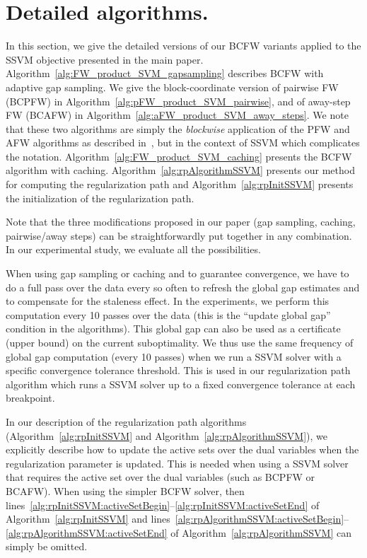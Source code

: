 \documentclass{article}
\begin{document}
\section{Detailed algorithms. \label{app:algorithms}}
In this section, we give the detailed versions of our BCFW variants applied to the SSVM objective presented in the main paper. Algorithm~\ref{alg:FW_product_SVM_gapsampling} describes BCFW with adaptive gap sampling. We give the block-coordinate version of pairwise FW (BCPFW) in Algorithm~\ref{alg:pFW_product_SVM_pairwise}, and of away-step FW (BCAFW) in Algorithm~\ref{alg:aFW_product_SVM_away_steps}. We note that these two algorithms are simply the \emph{blockwise} application of the PFW and AFW algorithms as described in~\citet{LacosteJulien2015linearFW}, but in the context of SSVM which complicates the notation.  Algorithm~\ref{alg:FW_product_SVM_caching} presents the BCFW algorithm with caching. Algorithm~\ref{alg:rpAlgorithmSSVM} presents our method for computing the regularization path and Algorithm~\ref{alg:rpInitSSVM} presents the initialization of the regularization path.

Note that the three modifications proposed in our paper (gap sampling, caching, pairwise/away steps) can be straightforwardly put together in any combination. In our experimental study, we evaluate all the possibilities.

When using gap sampling or caching and to guarantee convergence, we have to do a full pass over the data every so often to refresh the global gap estimates and to compensate for the staleness effect.
In the experiments, we perform this computation every 10 passes over the data (this is the ``update global gap'' condition in the algorithms). This global gap can also be used as a certificate (upper bound) on the current suboptimality. We thus use the same frequency of global gap computation (every 10 passes) when we run a SSVM solver with a specific convergence tolerance threshold. This is used in our regularization path algorithm which runs a SSVM solver up to a fixed convergence tolerance at each breakpoint.

In our description of the regularization path algorithms (Algorithm~\ref{alg:rpInitSSVM} and Algorithm~\ref{alg:rpAlgorithmSSVM}), we explicitly describe how to update the active sets over the dual variables when the regularization parameter is updated. This is needed when using a SSVM solver that requires the active set over the dual variables (such as BCPFW or BCAFW). When using the simpler BCFW solver, then lines~\ref{alg:rpInitSSVM:activeSetBegin}--\ref{alg:rpInitSSVM:activeSetEnd} of Algorithm~\ref{alg:rpInitSSVM}
and lines~\ref{alg:rpAlgorithmSSVM:activeSetBegin}--\ref{alg:rpAlgorithmSSVM:activeSetEnd} of Algorithm~\ref{alg:rpAlgorithmSSVM} can simply be omitted.
\end{document}
